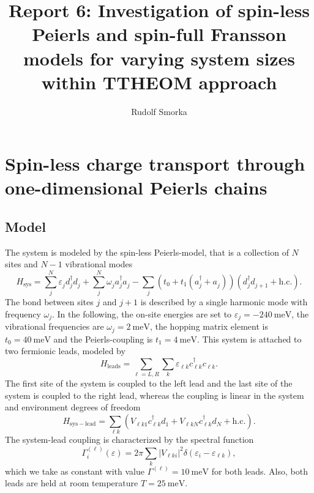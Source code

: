 \documentclass{article}
\newcommand{\pdagger}{{\phantom{\dagger}}}
\begin{document}
\title{Report 6: Investigation of spin-less Peierls and spin-full Fransson models for varying system sizes within TTHEOM approach}
\author{Rudolf Smorka}
\maketitle
\section{Spin-less charge transport through one-dimensional Peierls chains}
\subsection{Model}
The system is modeled by the spin-less Peierls-model, that is a collection of $N$ sites and $N-1$ vibrational modes 
\begin{equation}
	H_\mathrm{sys} = \sum_j^N \varepsilon_j^\pdagger d_j^\dagger d_j^\pdagger + \sum_j^N \omega_j^\pdagger a_j^\dagger a_j^\pdagger - \sum_j (t_0+t_1(a_j^\dagger + a_j^\pdagger))(d_{j}^\dagger d_{j+1}^\pdagger + \mathrm{h.c.}).
\end{equation}
The bond between sites $j$ and $j+1$ is described by a single harmonic mode with frequency $\omega_j$.
In the following, the on-site energies are set to $\varepsilon_j = \SI{-240}{\milli\electronvolt}$, the vibrational frequencies are $\omega_j = \SI{2}{\milli\electronvolt}$, the hopping matrix element is $t_0 = \SI{40}{\milli\electronvolt}$ and the Peierls-coupling is $t_1 = \SI{4}{\milli\electronvolt}$. This system is attached to two fermionic leads, modeled by 
\begin{equation}
	H_\mathrm{leads} = \sum_{\ell=L,R}\sum_k \varepsilon_{\ell k}^\pdagger c_{\ell k}^\dagger  c_{\ell k}^\pdagger.
\end{equation}
The first site of the system is coupled to the left lead and the last site of the system is coupled to the right lead, whereas the coupling is linear in the system and environment degrees of freedom
\begin{equation}
	H_\mathrm{sys-lead} = \sum_{\ell k} (V_{\ell k 1}^\pdagger c_{\ell k}^\dagger d_1^\pdagger + V_{\ell k N}^\pdagger c_{\ell k}^\dagger d_N^\pdagger + \mathrm{h.c.}).
\end{equation}
The system-lead coupling is characterized by the spectral function 
\begin{equation}
	\Gamma_i^{(\ell)}(\varepsilon) = 2\pi \sum_k \vert V_{\ell k i}\vert^2 \delta(\varepsilon_i-\varepsilon_{\ell k}),
\end{equation}
which we take as constant with value $\Gamma^{(\ell)}= \SI{10}{\milli\electronvolt}$ for both leads. Also, both leads are held at room temperature $T=\SI{25}{\milli\electronvolt}$.
\clearpage
\end{document}
